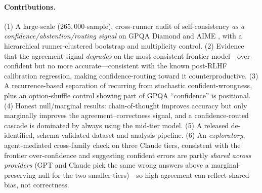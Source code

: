 \documentclass[11pt]{article}
\begin{document}
\paragraph{Contributions.}
(1) A large-scale ($265{,}000$-sample), cross-runner audit of self-consistency
\emph{as a confidence/abstention/routing signal} on GPQA Diamond \citep{rein2024gpqa} and AIME \citep{aime}, with a hierarchical
runner-clustered bootstrap and multiplicity control.
(2) Evidence that the agreement signal \emph{degrades} on the most consistent frontier
model---over-confident but no more accurate---consistent with the known post-RLHF calibration
regression, making confidence-routing toward it counterproductive.
(3) A recurrence-based separation of recurring from stochastic confident-wrongness, plus an
option-shuffle control showing part of GPQA ``confidence'' is positional.
(4) Honest null/marginal results: chain-of-thought improves accuracy but only marginally improves
the agreement--correctness signal, and a confidence-routed cascade is dominated by always using
the mid-tier model.
(5) A released de-identified, schema-validated dataset and analysis pipeline.
(6) An \emph{exploratory}, agent-mediated cross-family check on three Claude tiers, consistent with the
frontier over-confidence and suggesting confident errors are partly \emph{shared across providers} (GPT
and Claude pick the same wrong answers above a marginal-preserving null for the two smaller tiers)---so
high agreement can reflect shared bias, not correctness.
\end{document}
